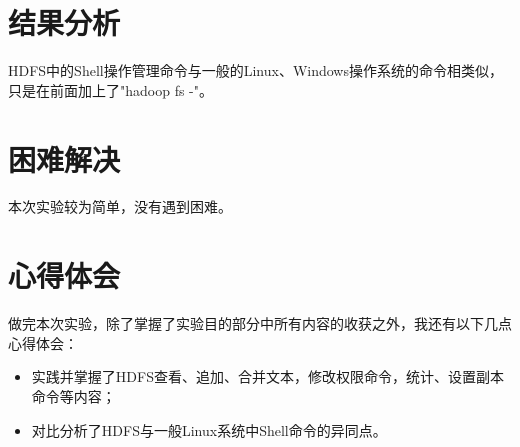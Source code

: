 \documentclass {article}
\begin{document}
	\section{结果分析}
		HDFS中的Shell操作管理命令与一般的Linux、Windows操作系统的命令相类似，只是在前面加上了"hadoop fs -"。
			
	\section{困难解决}
		本次实验较为简单，没有遇到困难。
	
	\section{心得体会}
		做完本次实验，除了掌握了实验目的部分中所有内容的收获之外，我还有以下几点心得体会：
		\begin{itemize}
			\item 实践并掌握了HDFS查看、追加、合并文本，修改权限命令，统计、设置副本命令等内容；
			\item 对比分析了HDFS与一般Linux系统中Shell命令的异同点。
		\end{itemize}
	
\end{document}
